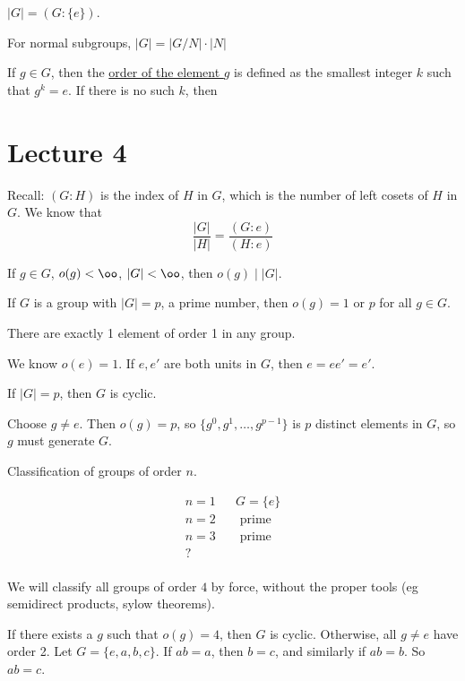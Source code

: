 \documentclass[x11names,reqno,14pt]{extarticle}
\begin{document}

$|G| = (G:\{e\})$. 

\cor

For normal subgroups, $|G| = |G/N|\cdot|N|$


If $g \in G$, then the \underline{order of the element $g$} is defined as the smallest integer $k$ such that $g^k = e$. If there is no such $k$, then 

\section*{Lecture 4}

Recall: $(G:H)$ is the index of $H$ in $G$, which is the number of left cosets of $H$ in $G$. We know that
\[
\frac{|G|}{|H|} = \frac{(G:e)}{(H:e)}
\]

\cor

If $g \in G$, $o(g) < \oo$, $|G|<\oo$, then $o(g) \mid |G|$. 

\cor If $G$ is a group with $|G| = p$, a prime number, then $o(g) = 1$ or $p$ for all $g \in G$. 

\lem

There are exactly 1 element of order 1 in any group. 

\proof

We know $o(e) = 1$. If $e, e'$ are both units in $G$, then $e =ee' = e'$. 

\cor

If $|G| = p$, then $G$ is cyclic. 

\proof Choose $g \neq e$. Then $o(g) = p$, so $\{g^0,g^1,\dots, g^{p - 1}\}$ is $p$ distinct elements in $G$, so $g$ must generate $G$. 

Classification of groups of order $n$. 

\begin{align*}
n = 1 & &G = \{e\} \\
n = 2 & &\text{ prime} \\
n = 3 & &\text{ prime} \\
? \\
\end{align*}

We will classify all groups of order $4$ by force, without the proper tools (eg semidirect products, sylow theorems). 

If there exists a $g$ such that $o(g) = 4$, then $G$ is cyclic. Otherwise, all $g \neq e$ have order 2. Let $G = \{e, a, b, c\}$. If $ab = a$, then $b = c$, and similarly if $ab = b$. So $ab = c$. 
\end{document}
